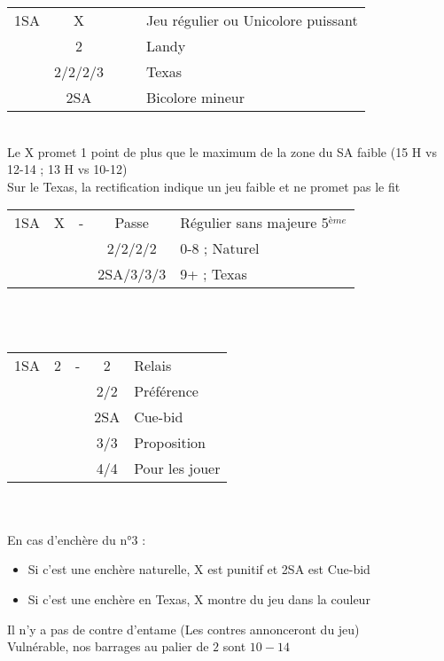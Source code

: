 \documentclass[a4paper, oneside, 11pt]{report}
\begin{document}
	\begin{tabular}{cccc|l}
	1SA & X &&& Jeu régulier ou Unicolore puissant\\
	& 2\trefle &&& Landy\\
	& 2\carreau/2\coeur/2\pique/3\trefle &&& Texas\\
	& 2SA &&& Bicolore mineur\\
	\end{tabular}\\
	Le X promet 1 point de plus que le maximum de la zone du SA faible (15 H vs 12-14 ; 13 H vs 10-12)\\
	Sur le Texas, la rectification indique un jeu faible et ne promet pas le fit\\

	\begin{tabular}{cccc|l}
	1SA & X & - & Passe & Régulier sans majeure 5$^{ème}$\\
	&&& 2\trefle/2\carreau/2\coeur/2\pique & 0-8 ; Naturel\\
	&&& 2SA/3\trefle/3\carreau/3\coeur & 9+ ; Texas\\
	\end{tabular}\\\\

	\begin{tabular}{cccc|l}
	1SA & 2\trefle & - & 2\carreau & Relais\\
	&&& 2\coeur/2\pique & Préférence\\
	&&& 2SA & Cue-bid\\
	&&& 3\coeur/3\pique & Proposition\\
	&&& 4\coeur/4\pique & Pour les jouer\\
	\end{tabular}\\\\

	En cas d'enchère du n°3 :
	\begin{itemize}
	\item Si c'est une enchère naturelle, X est punitif et 2SA est Cue-bid
	\item Si c'est une enchère en Texas, X montre du jeu dans la couleur
	\end{itemize}
	Il n'y a pas de contre d'entame (Les contres annonceront du jeu)\\	

		Vulnérable, nos barrages au palier de $2$ sont $10-14$\\
	
\end{document}
